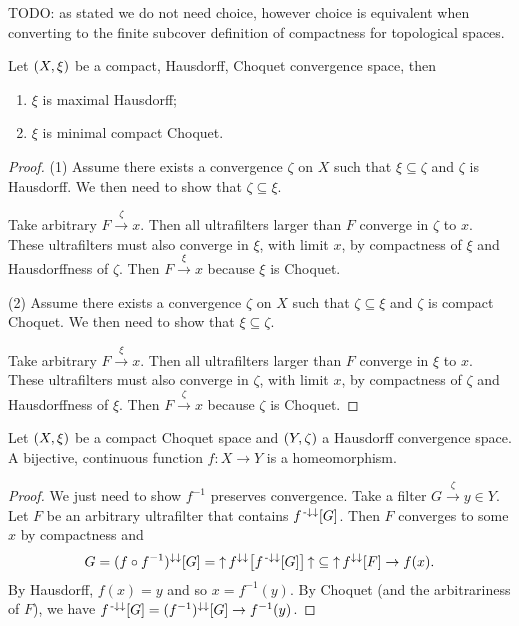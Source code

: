 TODO: as stated we do not need choice, however choice is equivalent when converting to the finite subcover definition of compactness for topological spaces.

\begin{proposition} \label{maximalHausdroffMinimalCompactChoquet}
Let $\left( X,\xi \right)$ be a compact, Hausdorff, Choquet convergence space, then
\begin{enumerate}
\item $\xi$ is maximal Hausdorff;
\item $\xi$ is minimal compact Choquet.
\end{enumerate}
\end{proposition}
\begin{proof}
(1) Assume there exists a convergence $\zeta$ on $X$ such that $\xi \subseteq \zeta$ and $\zeta$ is Hausdorff. We then need to show that $\zeta \subseteq \xi$.

Take arbitrary $F \overset{\zeta}{\longrightarrow} x$. Then all ultrafilters larger than $F$ converge in $\zeta$ to $x$. These ultrafilters must also converge in $\xi$, with limit $x$, by compactness of $\xi$ and Hausdorffness of $\zeta$. Then $F \overset{\xi}{\longrightarrow} x$ because $\xi$ is Choquet.

(2) Assume there exists a convergence $\zeta$ on $X$ such that $\zeta \subseteq \xi$ and $\zeta$ is compact Choquet. We then need to show that $\xi \subseteq \zeta$.

Take arbitrary $F \overset{\xi}{\longrightarrow} x$. Then all ultrafilters larger than $F$ converge in $\xi$ to $x$. These ultrafilters must also converge in $\zeta$, with limit $x$, by compactness of $\zeta$ and Hausdorffness of $\xi$. Then $F \overset{\zeta}{\longrightarrow} x$ because $\zeta$ is Choquet.
\end{proof}

\begin{proposition} \label{compactToHausdorffHomeomorphism}
Let $\left( X,\xi \right)$ be a compact Choquet space and $\left( Y, \zeta \right)$ a Hausdorff convergence space. A bijective, continuous function $f: X\to Y$ is a homeomorphism.
\end{proposition}
\begin{proof}
We just need to show $f^{-1}$ preserves convergence. Take a filter $G\overset{\zeta}{\longrightarrow} y \in Y$. Let $F$ be an arbitrary ultrafilter that contains $f^{{\text{\hspace{0.15em}-}\downarrow}\downarrow}[G]$. Then $F$ converges to some $x$ by compactness and
\[ G = (f\circ f^{-1})^{\downarrow\downarrow}[G] = \operatorname{\uparrow} f^{\downarrow\downarrow}\big[f^{{\text{\hspace{0.15em}-}\downarrow}\downarrow}[G]\big]\operatorname{\uparrow} \subseteq \operatorname{\uparrow} f^{\downarrow\downarrow}[F] \to f(x). \]
By Hausdorff, $f(x) = y$ and so $x = f^{-1}(y)$. By Choquet (and the arbitrariness of $F$), we have $f^{{\text{\hspace{0.15em}-}\downarrow}\downarrow}[G] = (f^{-1})^{\downarrow\downarrow}[G] \to f^{-1}(y)$.
\end{proof}

